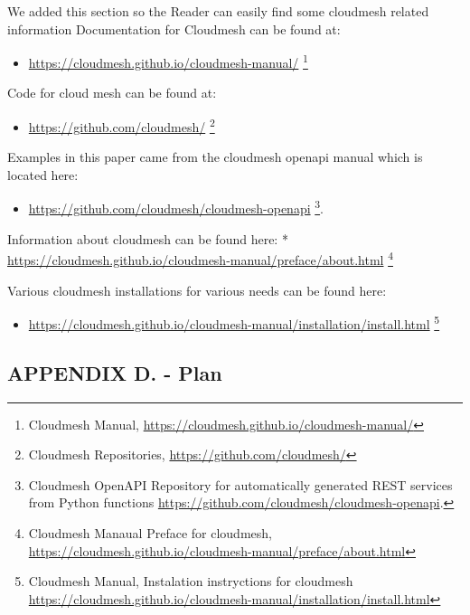 We added this section so the Reader can easily find some cloudmesh
related information Documentation for Cloudmesh can be found at:

\begin{itemize}
\tightlist
\item
  \url{https://cloudmesh.github.io/cloudmesh-manual/} \footnote{Cloudmesh
    Manual, \url{https://cloudmesh.github.io/cloudmesh-manual/}}
\end{itemize}

Code for cloud mesh can be found at:

\begin{itemize}
\tightlist
\item
  \url{https://github.com/cloudmesh/} \footnote{Cloudmesh Repositories,
    \url{https://github.com/cloudmesh/}}
\end{itemize}

Examples in this paper came from the cloudmesh openapi manual which is
located here:

\begin{itemize}
\tightlist
\item
  \url{https://github.com/cloudmesh/cloudmesh-openapi} \footnote{Cloudmesh
    OpenAPI Repository for automatically generated REST services from
    Python functions
    \url{https://github.com/cloudmesh/cloudmesh-openapi}.}.
\end{itemize}

Information about cloudmesh can be found here: *
\url{https://cloudmesh.github.io/cloudmesh-manual/preface/about.html}
\footnote{Cloudmesh Manaual Preface for cloudmesh,
  \url{https://cloudmesh.github.io/cloudmesh-manual/preface/about.html}}

Various cloudmesh installations for various needs can be found here:

\begin{itemize}
\tightlist
\item
  \url{https://cloudmesh.github.io/cloudmesh-manual/installation/install.html}
  \footnote{Cloudmesh Manual, Instalation instryctions for cloudmesh
    \url{https://cloudmesh.github.io/cloudmesh-manual/installation/install.html}}
\end{itemize}

\hypertarget{appendix-d.---plan}{%
\subsection{APPENDIX D. - Plan}\label{appendix-d.---plan}}

